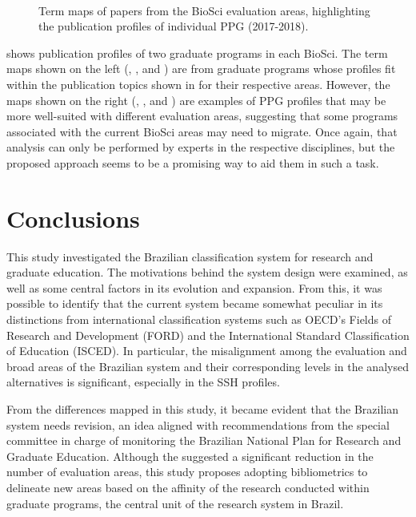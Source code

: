 \begin{figure}[H]
\begin{subfigure}[t]{.48\textwidth}
    \label{fig:classif:vosviewer_cb3b}
  \end{subfigure}\\ %
  \centering 
    \caption{Term maps of papers from the BioSci evaluation areas, highlighting the publication profiles of individual PPG (2017-2018).}
\label{fig:classif:vosviewer_cb_ppg}
\end{figure} 	 

 shows publication profiles of two graduate programs in each BioSci. The term maps shown on the left (, , and ) are from graduate programs whose profiles fit within the publication topics shown in  for their respective areas. However, the maps shown on the right (, , and ) are examples of PPG profiles that may be more well-suited with different evaluation areas, suggesting that some programs associated with the current BioSci areas may need to migrate. Once again, that analysis can only be performed by experts in the respective disciplines, but the proposed approach seems to be a promising way to aid them in such a task.

\section{Conclusions}
\label{sec:classif:Conclusions}

This study investigated the Brazilian classification system for research and graduate education. The motivations behind the system design were examined, as well as some central factors in its evolution and expansion. From this, it was possible to identify that the current system became somewhat peculiar in its distinctions from international classification systems such as OECD’s Fields of Research and Development (FORD) and the International Standard Classification of Education (ISCED). In particular, the misalignment among the evaluation and broad areas of the Brazilian system and their corresponding levels in the analysed alternatives is significant, especially in the SSH profiles.

From the differences mapped in this study, it became evident that the Brazilian system needs revision, an idea aligned with recommendations from the special committee in charge of monitoring the Brazilian National Plan for Research and Graduate Education. Although the \textcite{CEPNPG.2020} suggested a significant reduction in the number of evaluation areas, this study proposes adopting bibliometrics to delineate new areas based on the affinity of the research conducted within graduate programs, the central unit of the research system in Brazil.

